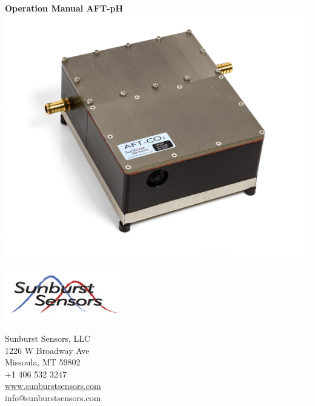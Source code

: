 \documentclass[twoside,letterpaper]{article}
\let\stdsection\section
\renewcommand\section{\newpage\stdsection}
\begin{document}

\let\oldsection\section
\def\section{\cleardoublepage\oldsection}

\begin{titlepage}
	\thispagestyle{empty}
		\begin{nolinenumbers}
           \vspace*{-3cm}
           \begin{center}
				{\Huge \textsf{\textbf{Operation Manual AFT-pH\\}}}
                \vspace{2cm}
                \includegraphics[scale=3.0]{figs/AFTCO20434.jpg}
			\end{center}
			\vspace*{\fill}

        \begingroup
            \centering
			\begin{minipage}[b]{0.5\hsize}
			\raggedright
			\includegraphics[scale=0.8]{figs/SBlogo.jpg}
			\end{minipage}
			\noindent
			\begin{minipage}[b]{0.5\hsize}
			\raggedleft
			\small
			Sunburst Sensors, LLC\\
			1226 W Broadway Ave\\
			Missoula, MT 59802\\
			+1 406 532 3247\\
            \url{www.sunburstsensors.com}\\
            info@sunburstsensors.com\\
			\end{minipage}
        \endgroup
			

\end{nolinenumbers}
\end{titlepage}
\end{document}
